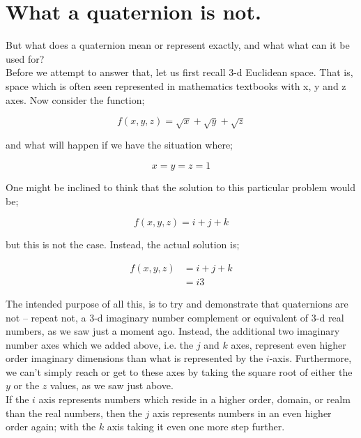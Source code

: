 \documentclass[12pt, a4paper]{article}
\begin{document}
\newpage

\section{What a quaternion is not.}

But what does a quaternion mean or represent exactly, and what what can it be
used for?\\

Before we attempt to answer that, let us first recall 3-d Euclidean space. That
is, space which is often seen represented in mathematics textbooks with x, y and
z axes. Now consider the function;

\begin{equation}\label{eqn:0}
f(x,y,z) = \sqrt{x} + \sqrt{y} + \sqrt{z}
\end{equation}

and what will happen if we have the situation where;

\begin{equation*}
x=y=z=1
\end{equation*}

One might be inclined to think that the solution to this particular problem
would be;

\begin{equation}\label{eqn:1}
f(x,y,z) = i + j + k
\end{equation}

but this is not the case. Instead, the actual solution is;

\begin{align}
f(x,y,z) &= i + j + k \\
         &= i3
\end{align}

The intended purpose of all this, is to try and demonstrate that quaternions are
not -- repeat not, a 3-d imaginary number complement or equivalent of 3-d real
numbers, as we saw just a moment ago. Instead, the additional two imaginary
number axes which we added above, i.e. the \(j\) and \(k\) axes, represent even
higher order imaginary dimensions than what is represented by the \(i\)-axis.
Furthermore, we can't simply reach or get to these axes by taking the square
root of either the \(y\) or the \(z\) values, as we saw just above.\\

If the \(i\) axis represents numbers which reside in a higher order, domain, or
realm than the real numbers, then the \(j\) axis represents numbers in an even
higher order again; with the \(k\) axis taking it even one more step further.
\end{document}
